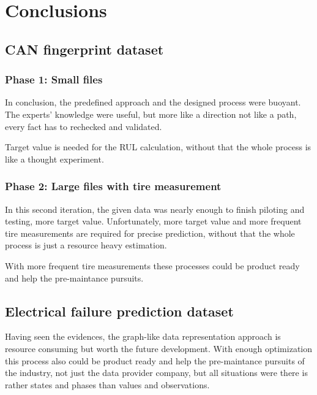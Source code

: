 \chapter{Conclusions}
\section{CAN fingerprint dataset}
\subsection{Phase 1: Small files}
In conclusion, the predefined approach and the designed process were buoyant. The experts' knowledge were useful, but more like a direction not like a path, every fact has to rechecked and validated.

Target value is needed for the RUL calculation, without that the whole process is like a thought experiment. 
\subsection{Phase 2: Large files with tire measurement}
In this second iteration, the given data was nearly enough to finish piloting and testing, more target value. Unfortunately, more target value and more frequent tire measurements are required for precise prediction, without that the whole process is just a resource heavy estimation.

With more frequent tire measurements these processes could be product ready and help the pre-maintance pursuits.

\section{Electrical failure prediction dataset}

Having seen the evidences, the graph-like data representation approach is resource consuming but worth the future development. With enough optimization this process also could be product ready and help the pre-maintance pursuits of the industry, not just the data provider company, but all situations were there is rather states and phases than values and observations.

